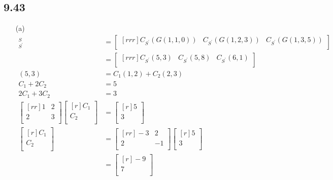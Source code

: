 \documentclass{report}
\begin{document}
\subsection{9.43}
\begin{enumerate}
\item[(a)]
\begin{align*}
[G]_{S^\prime}^S&=\begin{bmatrix}[rrr]C_{S^\prime}(G(1,1,0)) & C_{S^\prime}(G(1,2,3)) & C_{S^\prime}(G(1,3,5))\\\end{bmatrix}\\
&= \begin{bmatrix}[rrr]C_{S^\prime}(5,3) & C_{S^\prime}(5,8) & C_{S^\prime}(6,1)\\\end{bmatrix}\\
(5,3)&=C_1(1,2)+C_2(2,3)\\
C_1+2C_2&=5\\
2C_1+3C_2&=3\\
\begin{bmatrix}[rr]1&2\\2&3\\\end{bmatrix}\begin{bmatrix}[r]C_1\\C_2\\\end{bmatrix}&=\begin{bmatrix}[r]5\\3\\\end{bmatrix}\\
\begin{bmatrix}[r]C_1\\C_2\\\end{bmatrix}&=\begin{bmatrix}[rr]-3&2\\2&-1\\\end{bmatrix}\begin{bmatrix}[r]5\\3\\\end{bmatrix}\\
&= \begin{bmatrix}[r]-9\\7\\\end{bmatrix}\\

\end{align*}
\end{enumerate}
\end{document}
